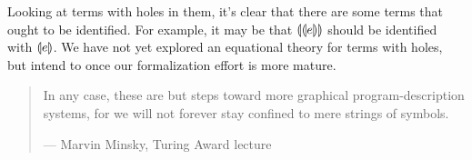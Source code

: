 \documentclass{llncs}
\begin{document}
Looking at terms with holes in them, it's clear that there are some
  terms that ought to be identified. For example, it may be that $\llparenthesis\llparenthesis e\rrparenthesis\rrparenthesis$
  should be identified with $\llparenthesis e\rrparenthesis$. We have not yet explored an
  equational theory for terms with holes, but intend to once our formalization
  effort is more mature.

\begin{quote}
In any case, these are but steps toward more graphical program-description
systems, for we will not forever stay confined to mere strings of symbols.

--- Marvin Minsky, Turing Award lecture
\end{quote}

%
%


\end{document}
